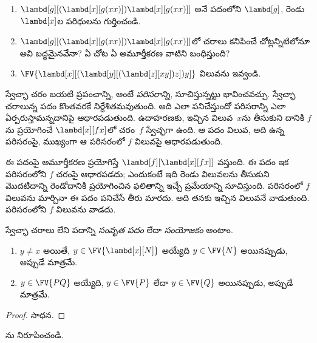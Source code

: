 \documentclass[../../../include/open-logic-section]{subfiles}
\begin{document}
\begin{prob}
  \begin{enumerate}
  \item $\lambd[g][(\lambd[x][g (x x)]) \lambd[x][g (x x)]]$
    అనే పదంలోని $\lambd[g]$, రెండు $\lambd[x]$ల పరిధులను
    గుర్తించండి.
  \item $\lambd[g][(\lambd[x][g (x x)]) \lambd[x][g (x x)]]$లో
    చరాలు కనిపించే చోట్లన్నిటిలోనూ అవి బద్ధమైనవేనా? ఏ చోట ఏ అమూర్తీకరణ
    వాటిని బంధిస్తుంది?
  \item $\FV{\lambd[x][(\lambd[y][(\lambd[z][x y]) z]) y]}$
    విలువను ఇవ్వండి.
  \end{enumerate}
\end{prob}

\begin{explain}
స్వేచ్ఛా చరం బయటి ప్రపంచాన్ని, అంటే \emph{పరిసరాన్ని}, సూచిస్తున్నట్టు
భావించవచ్చు. స్వేచ్ఛా చరాలున్న పదం కొంతవరకే నిర్దేశితమవుతుంది.
అది ఎలా పనిచేస్తుందో పరిసరాన్ని ఎలా ఏర్పరుస్తామన్నదానిపై ఆధారపడుతుంది.
ఉదాహరణకు, ఇచ్చిన విలువ~$x$ను తీసుకుని దానికి $f$ను ప్రయోగించే $\lambd[x][f x]$లో చరం~$f$
స్వేచ్ఛగా ఉంది. ఆ పదం విలువ, అది ఉన్న పరిసరంపై, ముఖ్యంగా ఆ
పరిసరంలో $f$ విలువపై ఆధారపడుతుంది.

ఈ పదంపై అమూర్తీకరణ ప్రయోగిస్తే $\lambd[f][\lambd[x][f
    x]]$ వస్తుంది. ఈ పదం ఇక పరిసరంలోని $f$ చరంపై ఆధారపడదు;
ఎందుకంటే ఇది రెండు విలువలను తీసుకుని మొదటిదాన్ని రెండోదానికి
ప్రయోగించిన ఫలితాన్ని ఇచ్చే ప్రమేయాన్ని సూచిస్తుంది. పరిసరంలో $f$
విలువను మార్చినా ఈ పదం పనిచేసే తీరు మారదు. అది తనకు ఇచ్చిన
విలువనే వాడుతుంది. పరిసరంలోని $f$ విలువను వాడదు.
\end{explain}

\begin{defn}[సంవృత పదం, సంయోజకం]
  స్వేచ్ఛా చరాలు లేని పదాన్ని \emph{సంవృత పదం} లేదా
  \emph{సంయోజకం} అంటాం.
\end{defn}

\begin{lem}
  \begin{enumerate}
    \item {} $y \neq x$ అయితే, $y \in
      \FV{\lambd[x][N]}$ అయ్యేది $y \in \FV{N}$ అయినప్పుడు,
       అప్పుడే మాత్రమే.
    \item {} $y \in \FV{PQ}$ అయ్యేది,
      $y \in \FV{P}$ లేదా $y \in \FV{Q}$ అయినప్పుడు,
       అప్పుడే మాత్రమే.
    \end{enumerate}
\end{lem}

\begin{proof}
  సాధన.
\end{proof}

\begin{prob}
  ను నిరూపించండి.
\end{prob}
\end{document}
